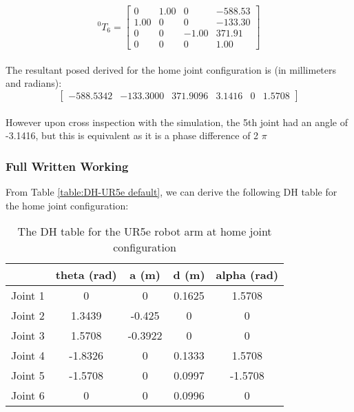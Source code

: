 \begin{equation*}
    ^{0}T_{6} = \begin{bmatrix}
        0    & 1.00 & 0     & -588.53 \\
        1.00 & 0    & 0     & -133.30 \\
        0    & 0    & -1.00 & 371.91  \\
        0    & 0    & 0     & 1.00
    \end{bmatrix}
\end{equation*}
\\The resultant posed derived for the home joint configuration is (in millimeters and radians):
\begin{equation*}
    \begin{bmatrix}
        -588.5342 & -133.3000 & 371.9096 & 3.1416 & 0 & 1.5708
    \end{bmatrix}
\end{equation*}
\\ However upon cross inspection with the simulation, the 5th joint had an angle of -3.1416, but this is equivalent as it is a phase difference of 2 $\pi$
\subsubsection{Full Written Working}

From Table \ref{table:DH-UR5e default}, we can derive the following DH table for the home joint configuration:

\begin{table}[H]
    \centering
    \begin{tabular}{|c|c|c|c|c|}
        \hline
                & \textbf{theta (rad)} & \textbf{a (m)} & \textbf{d (m)} & \textbf{alpha (rad)} \\ \hline
        Joint 1 & 0                    & 0              & 0.1625         & 1.5708               \\ \hline
        Joint 2 & 1.3439               & -0.425         & 0              & 0                    \\ \hline
        Joint 3 & 1.5708               & -0.3922        & 0              & 0                    \\ \hline
        Joint 4 & -1.8326              & 0              & 0.1333         & 1.5708               \\ \hline
        Joint 5 & -1.5708              & 0              & 0.0997         & -1.5708              \\ \hline
        Joint 6 & 0                    & 0              & 0.0996         & 0                    \\ \hline
    \end{tabular}
    \caption{The DH table for the UR5e robot arm at home joint configuration}
    \label{table:DH-UR5e home}
\end{table}


